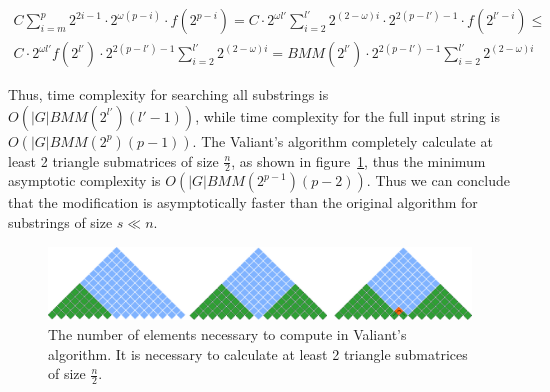 \begin{equation*}
\begin{array}{c}
C \sum\limits_{i=m}^p 2^{2i - 1} \cdot 2^{\omega(p - i)} \cdot f(2^{p - i}) =
C \cdot 2^{\omega l'}\sum\limits_{i=2}^{l'} 2^{(2 - \omega)i} \cdot 2^{2(p - l') - 1} \cdot f(2^{l' - i}) \le \\
C \cdot 2^{\omega l'} f(2^{l'}) \cdot 2^{2(p - l') - 1} \sum\limits_{i=2}^{l'} 2^{(2 - \omega)i} =
BMM(2^{l'}) \cdot 2^{2(p - l') - 1} \sum\limits_{i=2}^{l'} 2^{(2 - \omega)i}
\end{array}
\end{equation*}

Thus, time complexity for searching all substrings is  $O(|G|BMM(2^{l'})(l' - 1))$, while time complexity for the full input string is $O(|G|BMM(2^p)(p - 1))$. 
The Valiant's algorithm completely calculate at least 2 triangle submatrices of size $\frac{n}{2}$, as shown in figure~\ref{fig5}, thus the minimum asymptotic complexity is $O(|G|BMM(2^{p - 1})(p - 2))$.
Thus we can conclude that the modification is asymptotically faster than the original algorithm for substrings of size $s \ll n$.

\begin{figure}
\vspace{3mm}
 \begin{center}
 \includegraphics[width=12cm]{pictures/valsubstring.pdf}
    \caption{The number of elements necessary to compute in Valiant's algorithm. It is necessary to calculate at least 2 triangle submatrices of size $\frac{n}{2}$.}
    \label{fig5}
 \end{center}
\vspace{-8mm}
\end{figure}
